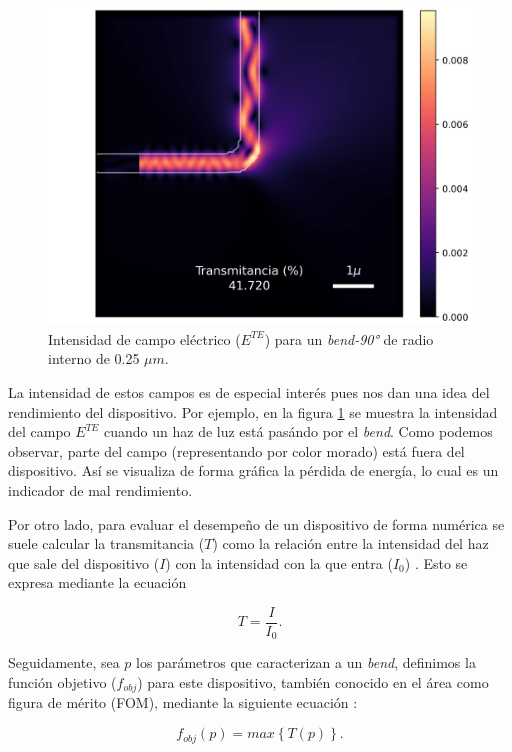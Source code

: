 \begin{figure}[ht]
  \centering
  \includegraphics[scale=0.7]{image/theory/bend-field.png}
  \caption{Intensidad de campo eléctrico ($E^{TE}$) para un \emph{bend-90°} de radio interno de 0.25 $\mu m$.}
  \label{fig:efield}
\end{figure}

La intensidad de estos campos es de especial interés pues nos dan una idea del rendimiento del dispositivo. 
Por ejemplo, en la figura \ref{fig:efield} se muestra la intensidad del campo
$E^{TE}$ cuando un haz de luz está pasándo por el \emph{bend}. 
Como podemos observar, parte del campo (representando por color morado) está
fuera del dispositivo.
Así se visualiza de forma gráfica la pérdida de energía, lo cual es un indicador de mal rendimiento.

Por otro lado, para evaluar el desempeño de un dispositivo de forma numérica se
suele calcular la transmitancia ($T$) como la relación entre la intensidad del haz
que sale del dispositivo ($I$) con la intensidad con la que entra ($I_0$) \citep{Su2020}. Esto se expresa mediante la ecuación

\begin{equation}
  T = \frac{I}{I_0}.
\label{eq:transmission}
\end{equation}

Seguidamente, sea $p$ los parámetros que caracterizan a un \emph{bend}, definimos la función objetivo ($f_{obj}$) para este dispositivo,
también conocido en el área como figura de mérito (FOM), mediante la siguiente ecuación
\citep{Su2020}:

\begin{equation}
  f_{obj}(p) = max \left \{ T(p) \right \}.
\label{eq:fom-bend}
\end{equation}

